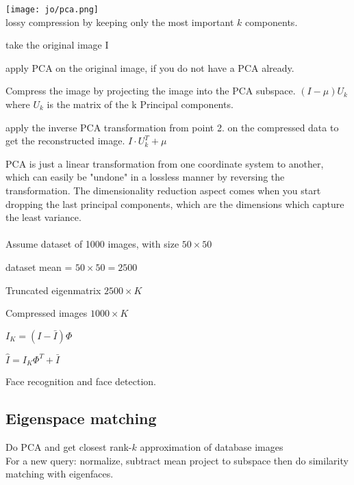 \texttt{[image: jo/pca.png]}\\
 lossy compression by keeping only the most important $k$ components.
\begin{compactitem}
\item take the original image I
\item apply PCA on the original image, if you do not have a PCA already.
\item Compress the image by projecting the image into the PCA subspace. $(I - \mu)U_k$ where $U_k$ is the matrix of the k Principal components.
\item apply the inverse PCA 
transformation from point 2. on the compressed data to get the reconstructed image. $I \cdot U_k^T + \mu$

\end{compactitem}
PCA is just a linear transformation from one coordinate system to another, which can easily be "undone" in a lossless manner by reversing the transformation. The dimensionality reduction aspect comes when you start dropping the last principal components, which are the dimensions which capture the least variance.\\
\\
Assume dataset of 1000 images, with size $50 \times 50$
\begin{compactenum}
    \item dataset mean = $50 \times 50 = 2500$
    \item Truncated eigenmatrix $2500 \times K$
    \item Compressed images $1000 \times K$
    \item $I_K = (I - \bar{I})\Phi$
    \item $\hat{I} = I_K \Phi^T + \bar{I}$
\end{compactenum}
Face recognition  and face detection.
\subsection*{Eigenspace matching}
Do PCA  and get closest rank-$k$ approximation of database images  \\
For a new query: normalize, subtract mean  project to subspace then do similarity matching with eigenfaces.
